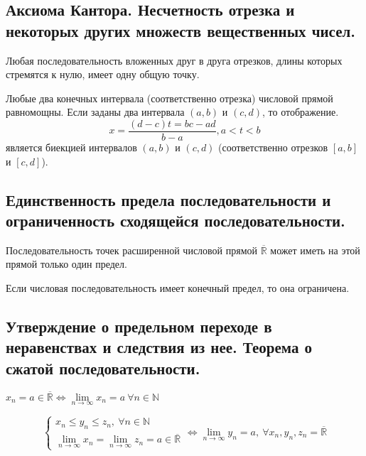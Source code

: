 \documentclass{article}
\begin{document}
\subsection{Аксиома Кантора. Несчетность отрезка и некоторых других множеств вещественных чисел.}

 Любая последовательность вложенных друг в друга отрезков, длины которых стремятся к нулю, имеет одну общую точку.

  Любые два конечных интервала (соответственно отрезка) числовой прямой равномощны. Если заданы два интервала $(a,b)$ и $(c,d)$, то отображение.
\begin{equation*}
		x = \frac{(d - c)t = bc - ad}{b - a}, a < t < b
\end{equation*}
является биекцией интервалов $(a,b)$ и $(c,d)$ (соответственно отрезков $[a,b]$ и $[c,d]$).

\subsection{Единственность предела последовательности и ограниченность сходящейся последовательности.}
 Последовательность точек расширенной числовой прямой $\overline{\mathbb{R}}$ может иметь на этой прямой только один предел.

 Если числовая последовательность имеет конечный предел, то она ограничена.

\subsection{Утверждение о предельном переходе в неравенствах и следствия из нее. Теорема о сжатой последовательности.}
 $x_n = a \in \overline{\mathbb{R}} \Leftrightarrow \lim\limits_{n \to \infty}x_n = a\  \forall n \in \mathbb{N}$

\begin{equation*}
	\begin{cases}
		x_n \leq y_n \leq z_n,\ \forall n \in \mathbb{N} \\
		\lim\limits_{n \to \infty}x_n = \lim\limits_{n \to \infty}z_n = a \in \overline{\mathbb{R}}
	\end{cases}
	\Leftrightarrow \lim\limits_{n \to \infty}y_n = a,\ \forall x_n, y_n, z_n = \overline{\mathbb{R}}
\end{equation*}
\end{document}
